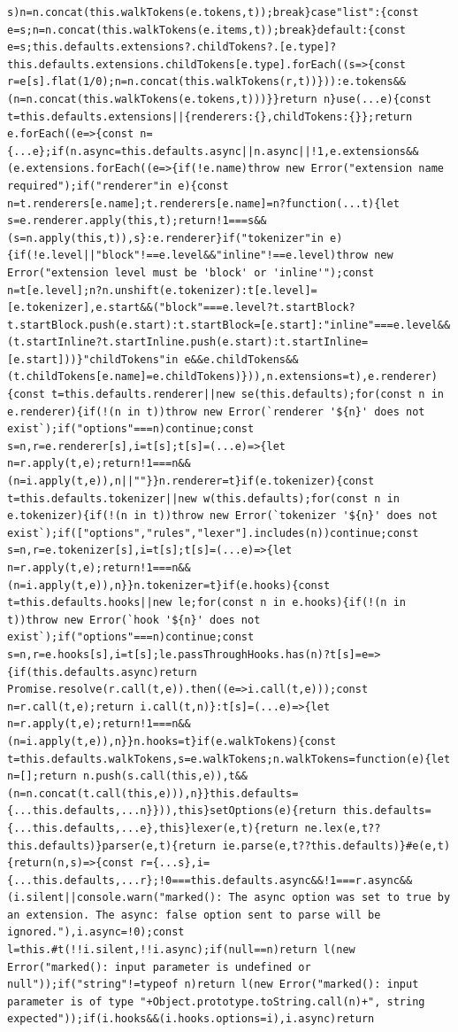 \documentclass[12pt,a4paper]{article}
\begin{document}
\begin{Verbatim}[fontsize=\footnotesize]
s)n=n.concat(this.walkTokens(e.tokens,t));break}case"list":{const e=s;n=n.concat(this.walkTokens(e.items,t));break}default:{const e=s;this.defaults.extensions?.childTokens?.[e.type]?this.defaults.extensions.childTokens[e.type].forEach((s=>{const r=e[s].flat(1/0);n=n.concat(this.walkTokens(r,t))})):e.tokens&&(n=n.concat(this.walkTokens(e.tokens,t)))}}return n}use(...e){const t=this.defaults.extensions||{renderers:{},childTokens:{}};return e.forEach((e=>{const n={...e};if(n.async=this.defaults.async||n.async||!1,e.extensions&&(e.extensions.forEach((e=>{if(!e.name)throw new Error("extension name required");if("renderer"in e){const n=t.renderers[e.name];t.renderers[e.name]=n?function(...t){let s=e.renderer.apply(this,t);return!1===s&&(s=n.apply(this,t)),s}:e.renderer}if("tokenizer"in e){if(!e.level||"block"!==e.level&&"inline"!==e.level)throw new Error("extension level must be 'block' or 'inline'");const n=t[e.level];n?n.unshift(e.tokenizer):t[e.level]=[e.tokenizer],e.start&&("block"===e.level?t.startBlock?t.startBlock.push(e.start):t.startBlock=[e.start]:"inline"===e.level&&(t.startInline?t.startInline.push(e.start):t.startInline=[e.start]))}"childTokens"in e&&e.childTokens&&(t.childTokens[e.name]=e.childTokens)})),n.extensions=t),e.renderer){const t=this.defaults.renderer||new se(this.defaults);for(const n in e.renderer){if(!(n in t))throw new Error(`renderer '${n}' does not exist`);if("options"===n)continue;const s=n,r=e.renderer[s],i=t[s];t[s]=(...e)=>{let n=r.apply(t,e);return!1===n&&(n=i.apply(t,e)),n||""}}n.renderer=t}if(e.tokenizer){const t=this.defaults.tokenizer||new w(this.defaults);for(const n in e.tokenizer){if(!(n in t))throw new Error(`tokenizer '${n}' does not exist`);if(["options","rules","lexer"].includes(n))continue;const s=n,r=e.tokenizer[s],i=t[s];t[s]=(...e)=>{let n=r.apply(t,e);return!1===n&&(n=i.apply(t,e)),n}}n.tokenizer=t}if(e.hooks){const t=this.defaults.hooks||new le;for(const n in e.hooks){if(!(n in t))throw new Error(`hook '${n}' does not exist`);if("options"===n)continue;const s=n,r=e.hooks[s],i=t[s];le.passThroughHooks.has(n)?t[s]=e=>{if(this.defaults.async)return Promise.resolve(r.call(t,e)).then((e=>i.call(t,e)));const n=r.call(t,e);return i.call(t,n)}:t[s]=(...e)=>{let n=r.apply(t,e);return!1===n&&(n=i.apply(t,e)),n}}n.hooks=t}if(e.walkTokens){const t=this.defaults.walkTokens,s=e.walkTokens;n.walkTokens=function(e){let n=[];return n.push(s.call(this,e)),t&&(n=n.concat(t.call(this,e))),n}}this.defaults={...this.defaults,...n}})),this}setOptions(e){return this.defaults={...this.defaults,...e},this}lexer(e,t){return ne.lex(e,t??this.defaults)}parser(e,t){return ie.parse(e,t??this.defaults)}#e(e,t){return(n,s)=>{const r={...s},i={...this.defaults,...r};!0===this.defaults.async&&!1===r.async&&(i.silent||console.warn("marked(): The async option was set to true by an extension. The async: false option sent to parse will be ignored."),i.async=!0);const l=this.#t(!!i.silent,!!i.async);if(null==n)return l(new Error("marked(): input parameter is undefined or null"));if("string"!=typeof n)return l(new Error("marked(): input parameter is of type "+Object.prototype.toString.call(n)+", string expected"));if(i.hooks&&(i.hooks.options=i),i.async)return 
\end{Verbatim}
\end{document}
